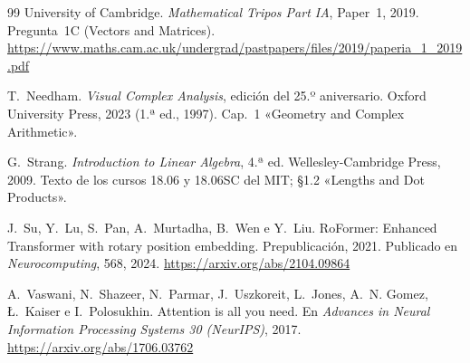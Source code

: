 \begin{thebibliography}{99}
University of Cambridge.
\newblock \emph{Mathematical Tripos Part IA}, Paper~1, 2019.
\newblock Pregunta~1C (Vectors and Matrices).
\newblock \url{https://www.maths.cam.ac.uk/undergrad/pastpapers/files/2019/paperia_1_2019.pdf}

T.~Needham.
\newblock \emph{Visual Complex Analysis}, edición del 25.º aniversario.
\newblock Oxford University Press, 2023 (1.ª ed., 1997).
\newblock Cap.~1 «Geometry and Complex Arithmetic».

G.~Strang.
\newblock \emph{Introduction to Linear Algebra}, 4.ª ed.
\newblock Wellesley-Cambridge Press, 2009.
\newblock Texto de los cursos 18.06 y 18.06SC del MIT; §1.2 «Lengths and Dot Products».

J.~Su, Y.~Lu, S.~Pan, A.~Murtadha, B.~Wen e Y.~Liu.
\newblock RoFormer: Enhanced Transformer with rotary position embedding.
\newblock Prepublicación, 2021. Publicado en \emph{Neurocomputing}, 568, 2024.
\newblock \url{https://arxiv.org/abs/2104.09864}

A.~Vaswani, N.~Shazeer, N.~Parmar, J.~Uszkoreit, L.~Jones, A.~N. Gomez, Ł.~Kaiser e I.~Polosukhin.
\newblock Attention is all you need.
\newblock En \emph{Advances in Neural Information Processing Systems 30 (NeurIPS)}, 2017.
\newblock \url{https://arxiv.org/abs/1706.03762}

\end{thebibliography}
